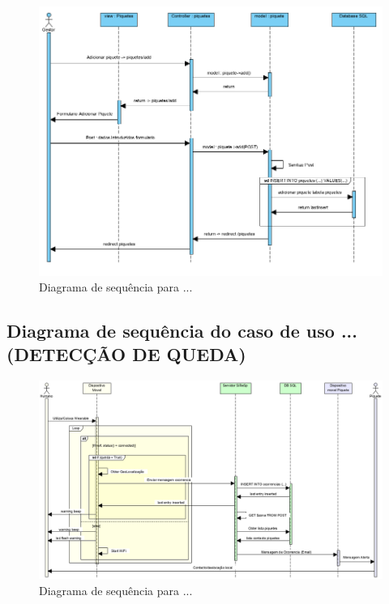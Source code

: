 \begin{figure}[!htb]
	\centering
	\includegraphics[width=\textwidth]{figuras/sequence_diagram_gestor.png}
	\caption{Diagrama de sequência para ...}
	\label{fig:sequência_gestor}
\end{figure}

\FloatBarrier\subsection{Diagrama de sequência do caso de uso ...(DETECÇÃO DE QUEDA)}



\begin{figure}[!htb]
	\centering
	\includegraphics[width=\textwidth]{figuras/sequence_diagram_system_2.png}
	\caption{Diagrama de sequência para ...}
	\label{fig:sequência_sistema}
\end{figure}

